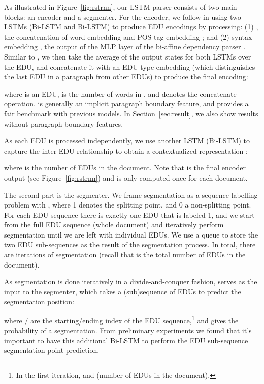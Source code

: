 \documentclass[11pt,a4paper]{article}
\newcommand{\secref}[2][]{Section#1~\ref{sec:#2}}
\newcommand{\figref}[2][]{Figure#1~\ref{fig:#2}}
\begin{document}
As illustrated in \figref{rstrnn}, our LSTM parser consists of two main
blocks: an encoder and a segmenter. For the encoder, we follow
\citet{yu2018transition} in using two LSTMs (Bi-LSTM and
Bi-LSTM) to produce EDU encodings by processing: (1) , the
concatenation of word embedding  and POS tag embedding ; and
(2) syntax embedding ,  the output of the MLP layer of
the bi-affine dependency parser \cite{dozat2017deep}. Similar to \citet{yu2018transition}, we then take the
average of the output states for both LSTMs over the EDU, and
concatenate it with an EDU type embedding  (which distinguishes
the last EDU in a paragraph from other EDUs) to produce the final
encoding:

where  is an EDU,  is the number of words in , and 
denotes the concatenate operation.  is generally an implicit paragraph boundary feature, and provides a fair benchmark with previous models. In \secref{result}, we also show results without paragraph boundary features.



As each EDU is processed independently, we use another LSTM
(Bi-LSTM) to capture the inter-EDU relationship to obtain a
contextualized representation :

where  is the number of EDUs in the document. Note that  is the final encoder output (see \figref{rstrnn}) and is only computed once for each document.

The second part is the segmenter. We frame segmentation as a
sequence labelling problem with , where 1 denotes
the splitting point, and 0 a non-splitting point. For each EDU sequence there is
exactly one EDU that is labeled 1, and we start from the full EDU
sequence (whole document) and iteratively perform segmentation until we
are left with individual EDUs.  We use a queue to store the two
EDU sub-sequences as the result of the segmentation process. In total,
there are  iterations of segmentation (recall that  is the total
number of EDUs in the document).

As segmentation is done iteratively in a divide-and-conquer fashion,
 serves as the input to the segmenter, which takes a
(sub)sequence of EDUs to predict the segmentation position:

where / are the starting/ending index of the EDU
sequence,\footnote{In the first iteration,  and  (number of
EDUs in the document).} and  gives the probability of a
segmentation. From preliminary experiments we found that it's important
to have this additional Bi-LSTM to perform the EDU sub-sequence
segmentation point prediction.
\end{document}
